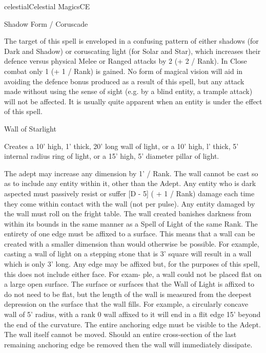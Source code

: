 \begin{College}[1.3]{celestial}{Celestial Magics}{CE}
\begin{spell}[G-4]{Shadow Form / Coruscade}

\begin{effects}
The target of this spell is enveloped in a confusing pattern of either
shadows (for Dark and Shadow) or coruscating light (for Solar and
Star), which increases their defence versus physical Melee or Ranged
attacks by 2 (+ 2 / Rank).  In Close combat only 1 (+ 1 / Rank) is
gained.  No form of magical vision will aid in avoiding the defence
bonus produced as a result of this spell, but any attack made without
using the sense of sight (e.g. by a blind entity, a trample attack)
will not be affected. It is usually quite apparent when an entity is
under the effect of this spell.
\end{effects}
\end{spell}


\begin{spell}[G-5]{Wall of Starlight}

\begin{effects}
Creates a 10’ high, 1’ thick, 20’ long wall of light, or a 10’ high,
l’ thick, 5’ internal radius ring of light, or a 15’ high, 5’ diameter
pillar of light.

The adept may increase any dimension by 1’ / Rank. The wall cannot be
cast so as to include any entity within it, other than the Adept.  Any
entity who is dark aspected must passively resist or suffer [D - 5] (
+ 1 / Rank) damage each time they come within contact with the wall
(not per pulse).  Any entity damaged by the wall must roll on the
fright table.  The wall created banishes darkness from within its
bounds in the same manner as a Spell of Light of the same Rank.  The
entirety of one edge must be affixed to a surface. This means that a
wall can be created with a smaller dimension than would otherwise be
possible. For example, casting a wall of light on a stepping stone
that is 3’ square will result in a wall which is only 3’ long.  Any
edge may be affixed but, for the purposes of this spell, this does not
include either face.  For exam- ple, a wall could not be placed flat
on a large open surface.  The surface or surfaces that the Wall of
Light is affixed to do not need to be flat, but the length of the wall
is measured from the deepest depression on the surface that the wall
fills.  For example, a circularly concave wall of 5’ radius, with a
rank 0 wall affixed to it will end in a flit edge 15’ beyond the end
of the curvature.  The entire anchoring edge must be visible to the
Adept.  The wall itself cannot be moved.  Should an entire
cross-section of the last remaining anchoring edge be removed then the
wall will immediately dissipate.


\end{effects}
\end{spell}
\end{College}
